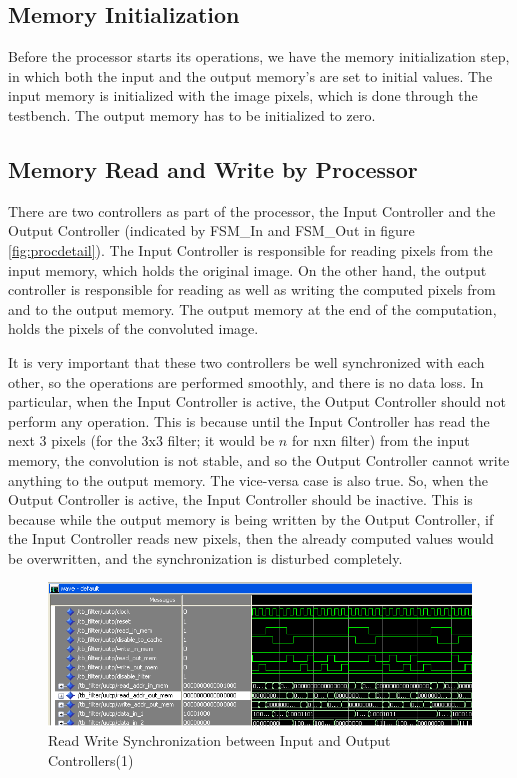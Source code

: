 \documentclass[11pt,a4paper]{article}
\begin{document}
\subsection{Memory Initialization}

Before the processor starts its operations, we have the memory initialization step, in which both the input and the output memory's are set to initial values. The input memory is initialized with the image pixels, which is done through the testbench. The output memory has to be initialized to zero.

\subsection{Memory Read and Write by Processor}
\label{sec:memreadwrite}

There are two controllers as part of the processor, the Input Controller and the Output Controller (indicated by FSM\_In and FSM\_Out in figure \ref{fig:procdetail}). The Input Controller is responsible for reading pixels from the input memory, which holds the original image. On the other hand, the output controller is responsible for reading as well as writing the computed pixels from and to the output memory. The output memory at the end of the computation, holds the pixels of the convoluted image. 

It is very important that these two controllers be well synchronized with each other, so the operations are performed smoothly, and there is no data loss. In particular, when the Input Controller is active, the Output Controller should not perform any operation. This is because until the Input Controller has read the next 3 pixels (for the 3x3 filter; it would be $n$ for nxn filter) from the input memory, the convolution is not stable, and so the Output Controller cannot write anything to the output memory. The vice-versa case is also true. So, when the Output Controller is active, the Input Controller should be inactive. This is because while the output memory is being written by the Output Controller, if the Input Controller reads new pixels, then the already computed values would be overwritten, and the synchronization is disturbed completely.

\begin{figure}[h]
	\centering
		\includegraphics[width=6in]{./images/controllerreadwrite.PNG}
	\caption{Read Write Synchronization between Input and Output Controllers(1)}	
	\label{fig:controllerreadwrite}
\end{figure}
\FloatBarrier
\end{document}
